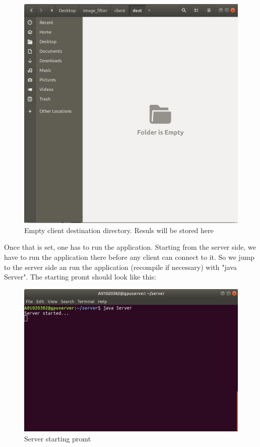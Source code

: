 \documentclass[a4paper,12pt]{article}
\begin{document}
	\begin{figure}[H]
		\centering
		\includegraphics[width=\textwidth]{emptydirclient.png}
		\caption{Empty client destination directory. Resuls will be stored here}
	\end{figure}	
	
	Once that is set, one has to run the application. Starting from the server side, we have to run the application there before any client can connect to it. So we jump to the server side an run the application (recompile if necessary) with "java Server". The starting promt should look like this:\\
	
	
	\begin{figure}[H]
		\centering
		\includegraphics[width=\textwidth]{serverinit.png}
		\caption{Server starting promt}
	\end{figure}	
	
\end{document}

